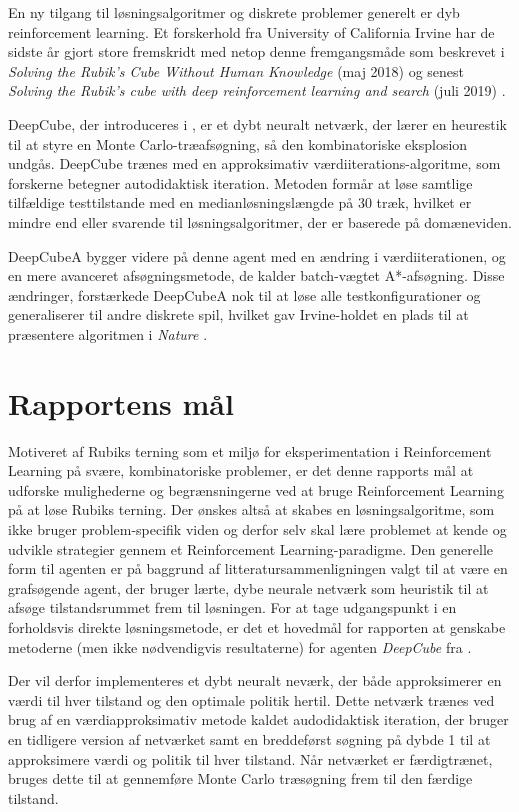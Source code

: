\documentclass[../main.tex]{subfiles}
\begin{document}
En ny tilgang til løsningsalgoritmer og diskrete problemer generelt er dyb reinforcement learning.
Et forskerhold fra University of California Irvine har de sidste år gjort store fremskridt med netop denne fremgangsmåde som beskrevet i \textit{Solving the Rubik's Cube Without Human Knowledge} (maj 2018) \cite{HumansBeGone} og senest \textit{Solving the Rubik’s cube with deep reinforcement learning and search} (juli 2019) \cite{SolvingNature}.

DeepCube, der introduceres i \cite{HumansBeGone}, er et dybt neuralt netværk, der lærer en heurestik til at styre en Monte Carlo-træafsøgning, så den kombinatoriske eksplosion undgås.
DeepCube trænes med en approksimativ værdiiterations-algoritme, som forskerne betegner autodidaktisk iteration.
Metoden formår at løse samtlige tilfældige testtilstande med en medianløsningslængde på 30 træk, hvilket er mindre end eller svarende til løsningsalgoritmer, der er baserede på domæneviden.

DeepCubeA \cite{SolvingNature} bygger videre på denne agent med en ændring i værdiiterationen, og en mere avanceret afsøgningsmetode, de kalder batch-vægtet A*-afsøgning.
Disse ændringer, forstærkede DeepCubeA nok til at løse alle testkonfigurationer og generaliserer til andre diskrete spil, hvilket gav Irvine-holdet en plads til at præsentere algoritmen i \textit{Nature} \cite{SolvingNature}.


\section{Rapportens mål}
Motiveret af Rubiks terning som et miljø for eksperimentation i Reinforcement Learning på svære, kombinatoriske problemer, er det denne rapports mål at udforske mulighederne og begrænsningerne ved at bruge Reinforcement Learning på at løse Rubiks terning.
Der ønskes altså at skabes en løsningsalgoritme, som ikke bruger problem-specifik viden og derfor selv skal lære problemet at kende og udvikle strategier gennem et Reinforcement Learning-paradigme. 
Den generelle form til agenten er på baggrund af litteratursammenligningen valgt til at være en grafsøgende agent, der bruger lærte, dybe neurale netværk som heuristik til at afsøge tilstandsrummet frem til løsningen. For at tage udgangspunkt i en forholdsvis direkte løsningsmetode, er det et hovedmål for rapporten at genskabe metoderne (men ikke nødvendigvis resultaterne) for agenten \textit{DeepCube} fra \cite{HumansBeGone}.

Der vil derfor implementeres et dybt neuralt neværk, der både approksimerer en værdi til hver tilstand og den optimale politik hertil. Dette netværk trænes ved brug af en værdiapproksimativ metode kaldet audodidaktisk iteration, der bruger en tidligere version af netværket samt en breddeførst søgning på dybde 1 til at approksimere værdi og politik til hver tilstand.
Når netværket er færdigtrænet, bruges dette til at gennemføre Monte Carlo træsøgning frem til den færdige tilstand. 
\end{document}
